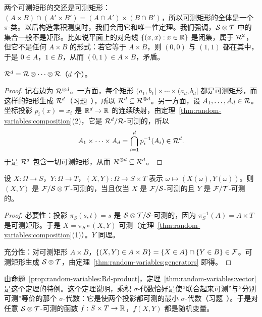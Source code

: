 两个可测矩形的交还是可测矩形：$(A\times B)\cap(A'\times B')=(A\cap A')\times(B\cap B')$，所以可测矩形的全体是一个 $\pi$-类。以后构造乘积测度时，我们会用它和唯一性定理。我们强调，$\mathcal{S}\otimes\mathcal{T}$ 中的集合一般不是矩形。比如说平面上的对角线 $\{(x,x):x\in\mathbb{R}\}$ 是闭集，属于 $\mathcal{R}^2$，但它不是任何 $A\times B$ 的形式：若它等于 $A\times B$，则 $(0,0)$ 与 $(1,1)$ 都在其中，于是 $0\in A$，$1\in B$，从而 $(0,1)\in A\times B$，矛盾。

\begin{proposition}\label{prop:random-variables:Rd-product}
$\mathcal{R}^d=\mathcal{R}\otimes\cdots\otimes\mathcal{R}$（$d$ 个）。
\end{proposition}
\begin{proof}
记右边为 $\mathcal{R}^{\otimes d}$。一方面，每个矩形 $(a_1,b_1]\times\cdots\times(a_d,b_d]$ 都是可测矩形，而这样的矩形生成 $\mathcal{R}^d$（习题~），所以 $\mathcal{R}^d\subseteq\mathcal{R}^{\otimes d}$。另一方面，设 $A_1,\dots,A_d\in\mathcal{R}$。坐标投影 $p_i(x)=x_i$ 是 $\mathbb{R}^d\to\mathbb{R}$ 的连续映射，由定理~\ref{thm:random-variables:composition}(2)，它是 $\mathcal{R}^d/\mathcal{R}$-可测的，所以
\[
A_1\times\cdots\times A_d=\bigcap_{i=1}^dp_i^{-1}(A_i)\in\mathcal{R}^d .
\]
于是 $\mathcal{R}^d$ 包含一切可测矩形，从而 $\mathcal{R}^{\otimes d}\subseteq\mathcal{R}^d$。
\end{proof}

\begin{theorem}[取值于乘积空间的映射]\label{thm:random-variables:product-map}
设 $X:\Omega\to S$，$Y:\Omega\to T$，$(X,Y):\Omega\to S\times T$ 表示 $\omega\mapsto(X(\omega),Y(\omega))$。则 $(X,Y)$ 是 $\mathcal{F}/\mathcal{S}\otimes\mathcal{T}$-可测的，当且仅当 $X$ 是 $\mathcal{F}/\mathcal{S}$-可测的且 $Y$ 是 $\mathcal{F}/\mathcal{T}$-可测的。
\end{theorem}
\begin{proof}
必要性：投影 $\pi_S(s,t)=s$ 是 $\mathcal{S}\otimes\mathcal{T}/\mathcal{S}$-可测的，因为 $\pi_S^{-1}(A)=A\times T$ 是可测矩形。于是 $X=\pi_S\circ(X,Y)$ 可测（定理~\ref{thm:random-variables:composition}(1)）。$Y$ 同理。

充分性：对可测矩形 $A\times B$，$\{(X,Y)\in A\times B\}=\{X\in A\}\cap\{Y\in B\}\in\mathcal{F}$。可测矩形生成 $\mathcal{S}\otimes\mathcal{T}$，由定理~\ref{thm:random-variables:generators} 即得。
\end{proof}

由命题~\ref{prop:random-variables:Rd-product}，定理~\ref{thm:random-variables:vector} 是这个定理的特例。这个定理说明，乘积 $\sigma$-代数恰好是使“联合起来可测”与“分别可测”等价的那个 $\sigma$-代数：它是使两个投影都可测的最小 $\sigma$-代数（习题~）。于是对任意 $\mathcal{S}\otimes\mathcal{T}$-可测的函数 $f:S\times T\to\mathbb{R}$，$f(X,Y)$ 都是随机变量。

